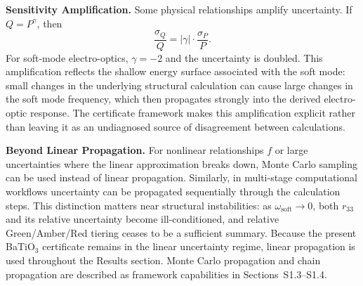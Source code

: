 \documentclass[twocolumn,superscriptaddress,amsmath,amssymb,longbibliography]{revtex4-2}
\begin{document}
{\bf Sensitivity Amplification.}
Some physical relationships amplify uncertainty. If $Q = P^\gamma$, then
\begin{equation}
\frac{\sigma_Q}{Q} = |\gamma| \cdot \frac{\sigma_P}{P}.
\end{equation}
For soft-mode electro-optics, $\gamma = -2$ and the uncertainty is doubled.
This amplification reflects the shallow energy surface associated with the soft mode:
small changes in the underlying structural calculation can cause large changes in the soft
mode frequency, which then propagates strongly into the derived electro-optic
response.
The certificate framework
makes this amplification explicit rather than leaving it as
an undiagnosed source of disagreement between calculations.

{\bf Beyond Linear Propagation.}
For nonlinear relationships $f$ or large uncertainties where the linear approximation
breaks down, Monte Carlo sampling can be used instead of linear propagation. Similarly, in multi-stage computational workflows uncertainty can be propagated sequentially through the calculation steps. This distinction matters near structural instabilities: as $\omega_{\mathrm{soft}}\to 0$, both $r_{33}$ and its relative uncertainty become ill-conditioned, and relative Green/Amber/Red tiering ceases to be a sufficient summary. Because the present BaTiO$_3$ certificate remains in the linear uncertainty regime, linear propagation is used throughout the Results section. Monte Carlo propagation and chain propagation are described as framework capabilities in Sections~S1.3--S1.4.

\end{document}
